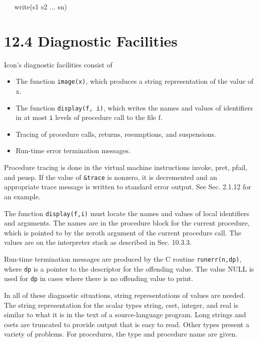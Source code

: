{\ttfamily\mdseries
\ \ \ write(s1 {\textbar}{\textbar} s2 {\textbar}{\textbar} ...{\textbar}{\textbar} sn)}


\section[12.4 Diagnostic Facilities]{12.4 Diagnostic Facilities}

Icon's diagnostic facilities consist of

\liststyleLxvii
\begin{itemize}

\item The function \texttt{image(x)}, which produces a string
representation of the value of x.

\item The function \texttt{display(f, i)}, which writes the names and
values of identifiers in at most \texttt{i} levels of procedure call
to the file f.

\item Tracing of procedure calls, returns, resumptions, and suspensions.

\item Run-time error termination messages.

\end{itemize}

Procedure tracing is done in the virtual machine instructions invoke,
pret, pfail, and psusp. If the value of \texttt{\&trace} is nonzero,
it is decremented and an appropriate trace message is written to
standard error output.  See Sec. 2.1.12 for an example.

The function \texttt{display(f,i)} must locate the names and values of
local identifiers and arguments. The names are in the procedure block
for the current procedure, which is pointed to by the zeroth argument
of the current procedure call. The values are on the interpreter stack
as described in Sec. 10.3.3.

Run-time termination messages are produced by the C routine
\texttt{runerr(n,dp)}, where \texttt{dp} is a pointer to the
descriptor for the offending value. The value NULL is used for
\texttt{dp} in cases where there is no offending value to print.

In all of these diagnostic situations, string representations of
values are needed. The string representation for the
{\textquotedbl}scalar{\textquotedbl} types string, cset, integer, and
real is similar to what it is in the text of a source-language
program. Long strings and csets are truncated to provide output that
is easy to read. Other types present a variety of problems. For
procedures, the type and procedure name are given.

